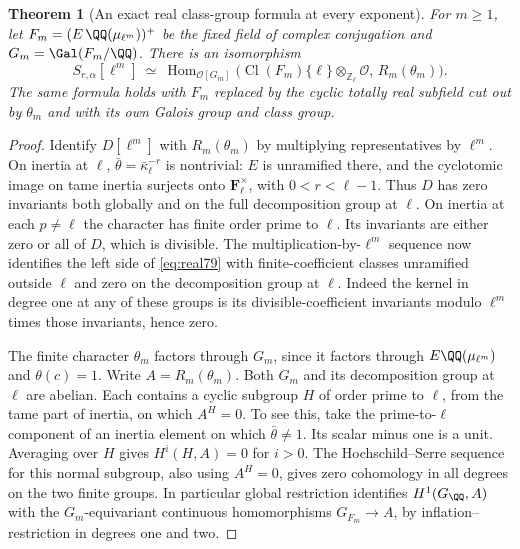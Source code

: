 \documentclass[a4paper,11pt]{article}
\newtheorem{theorem}[proposition]{Theorem}
\theoremstyle{definition}
\theoremstyle{remark}
\newcommand{\ZZ}{\mathbb Z}\newcommand{\ord}{\operatorname{ord}}
\numberwithin{equation}{section}
\newcommand{\Cl}{\operatorname{Cl}}
\newcommand{\OO}{\mathcal O}
\begin{document}
\begin{theorem}[An exact real class-group formula at every exponent]
\label{thm:real79}
For \(m\ge1\), let \(F_m=(E\,\QQ(\mu_{\ell^m}))^+\) be the
fixed field of complex conjugation and \(G_m=\Gal(F_m/\QQ)\).
There is an isomorphism
\begin{equation}
 S_{r,\alpha}[\ell^m]\ \simeq\
 \operatorname{Hom}_{\OO[G_m]}
 \bigl(\Cl(F_m)\{\ell\}\otimes_{\ZZ_\ell}\OO,\,
                       R_m(\theta_m)\bigr).
 \label{eq:real79}
\end{equation}
The same formula holds with \(F_m\) replaced by the cyclic
totally real subfield cut out by \(\theta_m\) and with its own
Galois group and class group.
\end{theorem}
\begin{proof}
Identify \(D[\ell^m]\) with \(R_m(\theta_m)\) by multiplying
representatives by \(\ell^m\). On inertia at \(\ell\),
\(\bar\theta=\bar\kappa_\ell^{-r}\) is nontrivial: \(E\) is
unramified there, and the cyclotomic image on tame inertia
surjects onto \(\mathbf F_\ell^\times\), with \(0<r<\ell-1\).
Thus \(D\) has zero invariants both globally and on the full
decomposition group at \(\ell\). On inertia at each \(p\ne\ell\)
the character has finite order prime to \(\ell\). Its invariants
are either zero or all of \(D\), which is divisible. The
multiplication-by-\(\ell^m\) sequence now identifies the left
side of \eqref{eq:real79} with finite-coefficient classes
unramified outside \(\ell\) and zero on the decomposition group
at \(\ell\). Indeed the kernel in degree one at any of these
groups is its divisible-coefficient invariants modulo
\(\ell^m\) times those invariants, hence zero.

The finite character \(\theta_m\) factors through \(G_m\),
since it factors through \(E\QQ(\mu_{\ell^m})\) and
\(\theta(c)=1\). Write \(A=R_m(\theta_m)\). Both \(G_m\) and
its decomposition group at \(\ell\) are abelian. Each contains
a cyclic subgroup \(H\) of order prime to \(\ell\), from the
tame part of inertia, on which \(A^H=0\). To see this, take
the prime-to-\(\ell\) component of an inertia element on which
\(\bar\theta\ne1\). Its scalar minus one is a unit. Averaging
over \(H\) gives \(H^i(H,A)=0\) for \(i>0\). The
Hochschild--Serre sequence for this normal subgroup, also
using \(A^H=0\), gives zero cohomology in all degrees on the
two finite groups. In particular global restriction identifies
\(H^1(G_\QQ,A)\) with the \(G_m\)-equivariant continuous
homomorphisms \(G_{F_m}\to A\), by inflation--restriction
in degrees one and two.


\end{proof}
\end{document}
